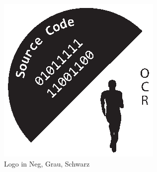 \begin{figure}[!hb]
\begin{minipage}[b]{0.30\textwidth}
	\end{minipage}
	\hfill
	\begin{minipage}[b]{0.20\textwidth}
		\includegraphics[width=\textwidth]{images/Logo-SW.eps}%
	\end{minipage}
	\caption{Logo in Neg, Grau, Schwarz}\label{fig:logoneggrauschwarz}%
\end{figure}


